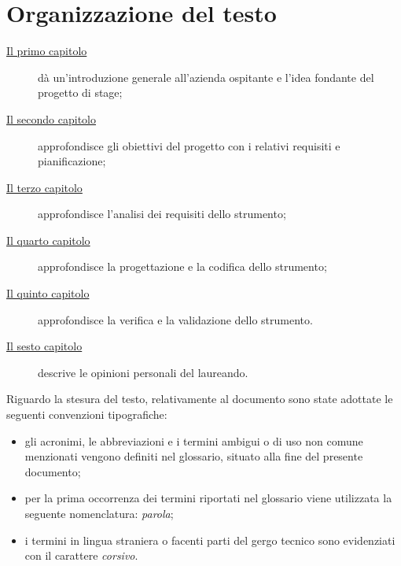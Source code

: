 
\section{Organizzazione del testo}\label{sec:organizzazione-del-testo}
\begin{description}
    \item[{\hyperref[ch:introduzione]{Il primo capitolo}}] dà un'introduzione generale all'azienda ospitante e l'idea fondante del progetto di stage;

    \item[{\hyperref[ch:descrizione-stage]{Il secondo capitolo}}] approfondisce gli obiettivi del progetto con i relativi requisiti e pianificazione;

    \item[{\hyperref[ch:analisi-requisiti]{Il terzo capitolo}}] approfondisce l'analisi dei requisiti dello strumento;

    \item[{\hyperref[ch:progettazione-e-codifica]{Il quarto capitolo}}] approfondisce la progettazione e la codifica dello strumento;

    \item[{\hyperref[ch:verifica-validazione]{Il quinto capitolo}}] approfondisce la verifica e la validazione dello strumento.

    \item[{\hyperref[ch:conclusioni]{Il sesto capitolo}}] descrive le opinioni personali del laureando.
\end{description}

Riguardo la stesura del testo, relativamente al documento sono state adottate le seguenti convenzioni tipografiche:
\begin{itemize}
	\item gli acronimi, le abbreviazioni e i termini ambigui o di uso non comune menzionati vengono definiti nel glossario, situato alla fine del presente documento;
	\item per la prima occorrenza dei termini riportati nel glossario viene utilizzata la seguente nomenclatura: \emph{parola}\glsfirstoccur;
	\item i termini in lingua straniera o facenti parti del gergo tecnico sono evidenziati con il carattere \emph{corsivo}.
\end{itemize}
